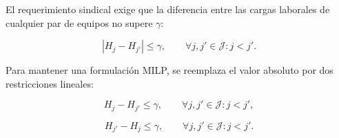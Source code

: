 El requerimiento sindical exige que la diferencia entre las cargas laborales de cualquier
par de equipos no supere $\gamma$:

\begin{equation}
|H_j-H_{j'}|
\leq
\gamma,
\qquad \forall j,j'\in\mathcal{J}: j<j'.
\end{equation}

Para mantener una formulación MILP, se reemplaza el valor absoluto por dos restricciones lineales:

\begin{equation}
H_j-H_{j'}
\leq
\gamma,
\qquad \forall j,j'\in\mathcal{J}: j<j',
\end{equation}

\begin{equation}
H_{j'}-H_j
\leq
\gamma,
\qquad \forall j,j'\in\mathcal{J}: j<j'.
\end{equation}
